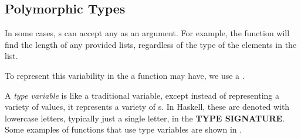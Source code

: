 \subsection{Polymorphic Types}\label{subsec:Polymorphic_Types}
In some cases, s can accept any  as an argument.
For example, the  function will find the length of any provided lists, regardless of the type of the elements in the list.

To represent this variability in the  a function may have, we use a .

\begin{definition}\label{def:Type_Variable}
  A \emph{type variable} is like a traditional variable, except instead of representing a variety of values, it represents a variety of s.
  In Haskell, these are denoted with lowercase letters, typically just a single letter, in the \textbf{TYPE SIGNATURE}.
  Some examples of functions that use type variables are shown in .
\end{definition}

